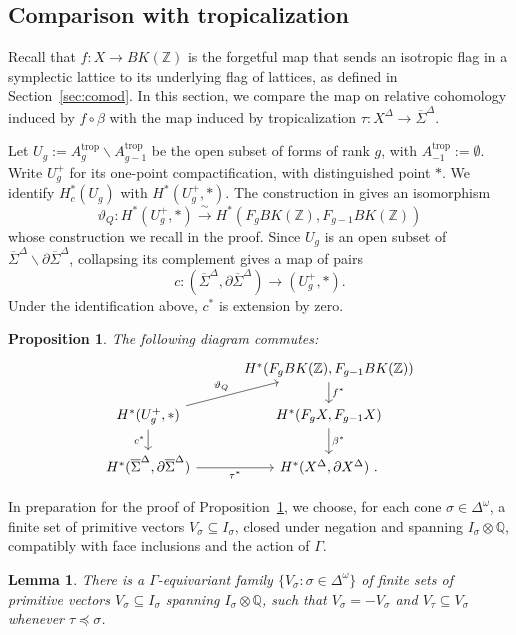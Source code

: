 \documentclass[12 pt]{amsart}
\newcommand{\QQ}{\mathbb{Q}}
\newcommand{\ZZ}{\mathbb{Z}}
\newcommand{\trop}{\mathrm{trop}}
\newcommand{\<}{\langle}
\renewcommand{\>}{\rangle}
\newtheorem{proposition}[theorem]{Proposition}
\newtheorem{lemma}[theorem]{Lemma}
\theoremstyle{definition}
\begin{document}
\subsection{Comparison with tropicalization}\label{sec:tropical-comparison}

Recall that $f \colon X \to BK(\ZZ)$ is the forgetful map that sends an isotropic flag in a symplectic lattice to its underlying flag of lattices, as defined in Section~\ref{sec:comod}. In this section, we compare the map on relative cohomology induced by $f \circ \beta$ with the map induced by tropicalization $\tau \colon X^\Delta \to \overline \Sigma^\Delta$.

Let $U_g := A_g^\trop \smallsetminus A_{g - 1}^\trop$ be the open subset of forms of rank $g$, with $A_{-1}^\trop := \emptyset$. Write $U_g^+$ for its one-point compactification, with distinguished point $*$. We identify $H_c^*(U_g)$ with $H^*(U_g^+, *)$. The construction in \cite[\S2.4]{BCGP} gives an isomorphism
\[
\vartheta_Q \colon H^*(U_g^+, *) \xrightarrow{\ \sim \ } H^*(F_g BK(\ZZ), F_{g - 1} BK(\ZZ))
\]
whose construction we recall in the proof. Since $U_g$ is an open subset of $\overline \Sigma^\Delta \smallsetminus \partial \overline \Sigma^\Delta$, collapsing its complement gives a map of pairs
\[
c \colon (\overline \Sigma^\Delta, \partial \overline \Sigma^\Delta) \longrightarrow (U_g^+, *).
\]
Under the identification above, $c^*$ is extension by zero.

\begin{proposition}\label{prop:bcgp-incidence-square}
The following diagram commutes:
\[
\begin{tikzcd}[column sep=3em,row sep=1.5em]
& H^*(F_g BK(\ZZ), F_{g - 1} BK(\ZZ)) \arrow[d,"f^*"] \\
H^*(U_g^+, *) \arrow[ur,"\vartheta_Q"] \arrow[d,"c^*"'] & H^*(F_g X, F_{g - 1} X) \arrow[d,"\beta^*"] \\
H^*(\overline \Sigma^\Delta, \partial \overline \Sigma^\Delta) \arrow[r,"\tau^*"'] & H^*(X^\Delta, \partial X^\Delta) \ .
\end{tikzcd}
\]
\end{proposition}

In preparation for the proof of Proposition~\ref{prop:bcgp-incidence-square}, we choose, for each cone $\sigma \in \Delta^\omega$, a finite set of primitive vectors $V_\sigma \subseteq I_\sigma$, closed under negation and spanning $I_\sigma \otimes \QQ$, compatibly with face inclusions and the action of $\Gamma$.

\begin{lemma}\label{lem:compatible-spanning-sets}
There is a $\Gamma$-equivariant family $\{ V_\sigma : \sigma \in \Delta^\omega \}$ of finite sets of primitive vectors $V_\sigma \subseteq I_\sigma$ spanning $I_\sigma \otimes \QQ$, such that $V_\sigma = -V_\sigma$ and $V_\tau \subseteq V_\sigma$ whenever $\tau \preceq \sigma$.
\end{lemma}
\end{document}
